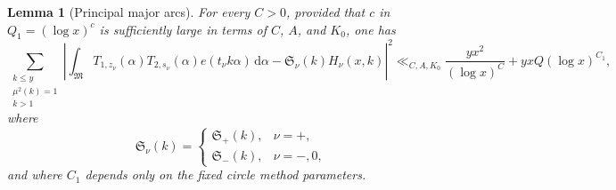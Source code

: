 \documentclass[12pt,reqno]{amsart}
\numberwithin{equation}{section}
\theoremstyle{plain}
\newtheorem{lemma}[theorem]{Lemma}
\theoremstyle{remark}
\newcommand{\dif}{\mathrm{d}}
\newcommand{\majorarc}{\mathfrak{M}}
\begin{document}
\begin{lemma}[Principal major arcs]\label{lem:principal-arcs}
For every $C>0$, provided that $c$ in $Q_1=(\log x)^c$
is sufficiently large in terms of $C$, $A$, and $K_0$, one has
\begin{equation}\label{principal-L2}
 \sum_{\substack{k\leq y\\\mu^2(k)=1\\k>1}}
 \left|\int_{\majorarc}T_{1,z_\nu}(\alpha)T_{2,s_\nu}(\alpha)
 e(t_\nu k\alpha)\,\dif\alpha
 -\mathfrak S_\nu(k)H_\nu(x,k)\right|^2
 \ll_{C,A,K_0}
 \frac{yx^2}{(\log x)^C}+yxQ(\log x)^{C_1},
\end{equation}
where
\[
 \mathfrak S_\nu(k)=
 \begin{cases}
  \mathfrak S_+(k),&\nu=+,\\
  \mathfrak S_-(k),&\nu=-,0,
 \end{cases}
\]
and where $C_1$ depends only on the fixed circle method parameters.
\end{lemma}
\end{document}

